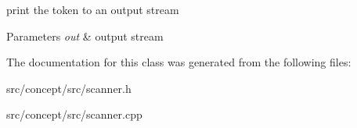 print the token to an output stream 


\begin{DoxyParams}{Parameters}
{\em out} & output stream \\
\hline
\end{DoxyParams}


The documentation for this class was generated from the following files\-:\begin{DoxyCompactItemize}
\item 
src/concept/src/scanner.\-h\item 
src/concept/src/scanner.\-cpp\end{DoxyCompactItemize}
